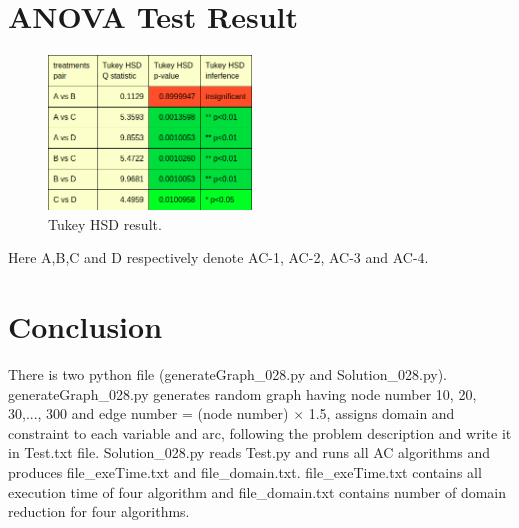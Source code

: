 \documentclass[12pt,twocolumn,letterpaper]{article}
\begin{document}
\section*{ANOVA Test Result}
\begin{figure}[h]
\includegraphics[width=0.48\textwidth]{tukey_HSD}
\caption{\scriptsize Tukey HSD result.}
\end{figure}
Here A,B,C and D respectively denote AC-1, AC-2, AC-3 and AC-4.
\\
\section*{Conclusion}
There is two python file (generateGraph\_028.py and Solution\_028.py). generateGraph\_028.py generates random graph having node number 10, 20, 30,..., 300 and edge number = (node number) $\times$ 1.5, assigns domain and constraint to each variable and arc, following the problem description and write it in Test.txt file. Solution\_028.py reads Test.py and runs all AC algorithms and produces file\_exeTime.txt and file\_domain.txt. file\_exeTime.txt contains all execution time of four algorithm and file\_domain.txt contains number of domain reduction for four algorithms.
\end{document}
